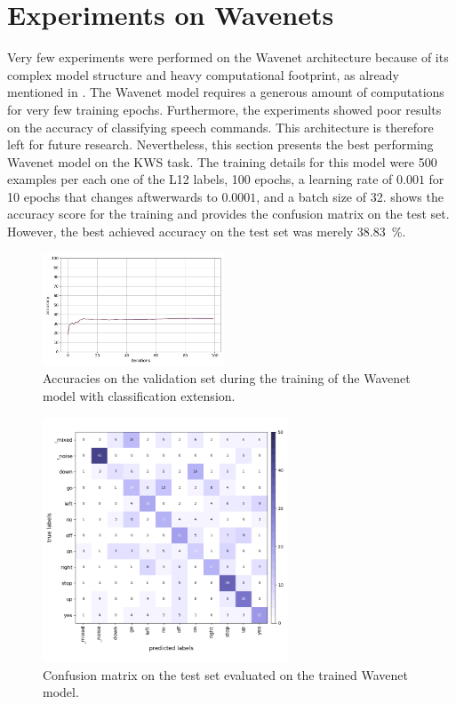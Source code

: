 
\section{Experiments on Wavenets}\label{exp_wavenet}
Very few experiments were performed on the Wavenet architecture because of its complex model structure and heavy computational footprint, as already mentioned in .
The Wavenet model requires a generous amount of computations for very few training epochs.
Furthermore, the experiments showed poor results on the accuracy of classifying speech commands.
This architecture is therefore left for future research.
Nevertheless, this section presents the best performing Wavenet model on the KWS task.
The training details for this model were 500 examples per each one of the L12 labels, 100 epochs, a learning rate of $0.001$ for 10 epochs that changes aftwerwards to $0.0001$, and a batch size of 32.
 shows the accuracy score for the training and  provides the confusion matrix on the test set.
However, the best achieved accuracy on the test set was merely \SI{38.83}{\percent}.
\begin{figure}[!ht]
  \centering
  \includegraphics[width=0.48\textwidth]{./5_exp/figs/exp_wavenet_acc.png}
  \caption{Accuracies on the validation set during the training of the Wavenet model with classification extension.}
  \label{fig:exp_wavenet_acc}
\end{figure}
\begin{figure}[!ht]
  \centering
  \includegraphics[width=0.65\textwidth]{./5_exp/figs/exp_wavenet_confusion_test.png}
  \caption{Confusion matrix on the test set evaluated on the trained Wavenet model.}
  \label{fig:exp_wavenet_confusion}
\end{figure}
\FloatBarrier
\noindent